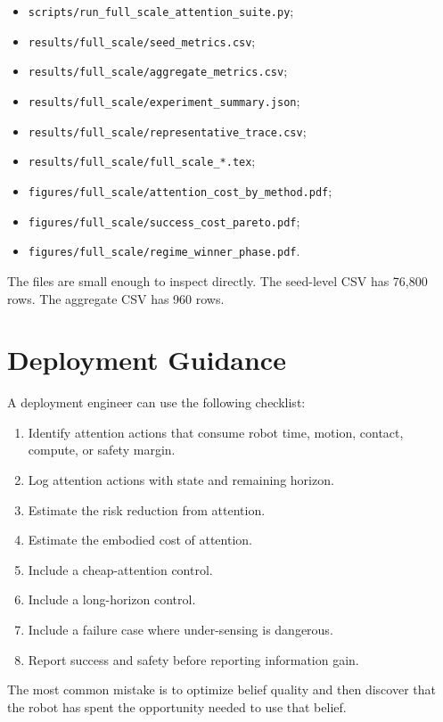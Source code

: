\documentclass{article}
\begin{document}
\begin{itemize}
    \item \texttt{scripts/run\_full\_scale\_attention\_suite.py};
    \item \texttt{results/full\_scale/seed\_metrics.csv};
    \item \texttt{results/full\_scale/aggregate\_metrics.csv};
    \item \texttt{results/full\_scale/experiment\_summary.json};
    \item \texttt{results/full\_scale/representative\_trace.csv};
    \item \texttt{results/full\_scale/full\_scale\_*.tex};
    \item \texttt{figures/full\_scale/attention\_cost\_by\_method.pdf};
    \item \texttt{figures/full\_scale/success\_cost\_pareto.pdf};
    \item \texttt{figures/full\_scale/regime\_winner\_phase.pdf}.
\end{itemize}

The files are small enough to inspect directly. The seed-level CSV has 76,800
rows. The aggregate CSV has 960 rows.

\section{Deployment Guidance}

A deployment engineer can use the following checklist:

\begin{enumerate}
    \item Identify attention actions that consume robot time, motion, contact,
    compute, or safety margin.
    \item Log attention actions with state and remaining horizon.
    \item Estimate the risk reduction from attention.
    \item Estimate the embodied cost of attention.
    \item Include a cheap-attention control.
    \item Include a long-horizon control.
    \item Include a failure case where under-sensing is dangerous.
    \item Report success and safety before reporting information gain.
\end{enumerate}

The most common mistake is to optimize belief quality and then discover that
the robot has spent the opportunity needed to use that belief.
\end{document}
